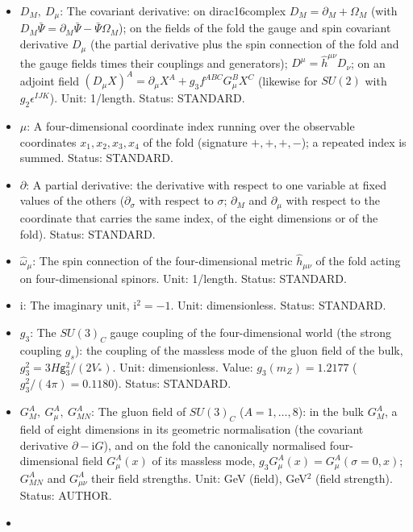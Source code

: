 \documentclass[
  10pt,
]{article}
\providecommand{\tightlist}{%
  \setlength{\itemsep}{0pt}\setlength{\parskip}{0pt}}
\begin{document}
\begin{itemize}
\tightlist
\item
  \(D_M,\ D_\mu\): The covariant derivative: on dirac16complex
  \(D_M = \partial_M + \Omega_M\) (with
  \(D_M\bar\Psi = \partial_M\bar\Psi - \bar\Psi\Omega_M\)); on the
  fields of the fold the gauge and spin covariant derivative \(D_\mu\)
  (the partial derivative plus the spin connection of the fold and the
  gauge fields times their couplings and generators);
  \(D^\mu = \hat h^{\mu\nu}D_\nu\); on an adjoint field
  \((D_\mu X)^A = \partial_\mu X^A + g_3f^{ABC}G^B_\mu X^C\) (likewise
  for \(SU(2)\) with \(g_2\epsilon^{IJK}\)). Unit: 1/length. Status:
  STANDARD.
\item
  \(\mu\): A four-dimensional coordinate index running over the
  observable coordinates \(x_1, x_2, x_3, x_4\) of the fold (signature
  \(+,+,+,-\)); a repeated index is summed. Status: STANDARD.
\item
  \(\partial\): A partial derivative: the derivative with respect to one
  variable at fixed values of the others (\(\partial_\sigma\) with
  respect to \(\sigma\); \(\partial_M\) and \(\partial_\mu\) with
  respect to the coordinate that carries the same index, of the eight
  dimensions or of the fold). Status: STANDARD.
\item
  \(\hat\omega_\mu\): The spin connection of the four-dimensional metric
  \(\hat h_{\mu\nu}\) of the fold acting on four-dimensional spinors.
  Unit: 1/length. Status: STANDARD.
\item
  \(\mathrm{i}\): The imaginary unit, \(\mathrm{i}^2 = -1\). Unit:
  dimensionless. Status: STANDARD.
\item
  \(g_3\): The \(SU(3)_C\) gauge coupling of the four-dimensional world
  (the strong coupling \(g_s\)): the coupling of the massless mode of
  the gluon field of the bulk, \(g_3^2 = 3H\mathsf{g}_3^2/(2V_*)\).
  Unit: dimensionless. Value: \(g_3(m_Z) = 1.2177\)
  (\(g_3^2/(4\pi) = 0.1180\)). Status: STANDARD.
\item
  \(G^A_M,\ G^A_\mu,\ G^A_{MN}\): The gluon field of \(SU(3)_C\)
  (\(A = 1, \dots, 8\)): in the bulk \(G^A_M\), a field of eight
  dimensions in its geometric normalisation (the covariant derivative
  \(\partial - \mathrm{i}G\)), and on the fold the canonically
  normalised four-dimensional field \(G^A_\mu(x)\) of its massless mode,
  \(g_3G^A_\mu(x) = G^A_\mu(\sigma = 0, x)\); \(G^A_{MN}\) and
  \(G^A_{\mu\nu}\) their field strengths. Unit: GeV (field), GeV\(^2\)
  (field strength). Status: AUTHOR.
\item

\end{itemize}
\end{document}
